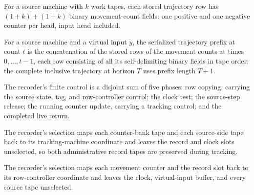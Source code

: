 \begin{definition}
\label{Complexity.clRecFields}
\leanok
{}
For a source machine with $k$ work tapes, each stored trajectory row has $(1+k) + (1+k)$ binary movement-count fields: one positive and one negative counter per head, input head included.
\end{definition}

\begin{definition}
\label{Complexity.clRecords}
\leanok
{}
For a source machine and a virtual input $y$, the serialized trajectory prefix at count $t$ is the concatenation of the stored rows of the movement counts at times $0, \dots, t-1$, each row consisting of all its self-delimiting binary fields in tape order; the complete inclusive trajectory at horizon $T$ uses prefix length $T+1$.
\end{definition}

\begin{definition}
\label{Complexity.clRecState}
\leanok
{}
The recorder's finite control is a disjoint sum of five phases: row copying, carrying the source state, tag, and row-controller control; the clock test; the source-step release; the running counter update, carrying a tracking control; and the completed live return.
\end{definition}

\begin{definition}
\label{Complexity.clRecTrackSelect}
\leanok
{}
The recorder's selection maps each counter-bank tape and each source-side tape back to its tracking-machine coordinate and leaves the record and clock slots unselected, so both administrative record tapes are preserved during tracking.
\end{definition}

\begin{definition}
\label{Complexity.clRecRowSelect}
\leanok
{}
The recorder's selection maps each movement counter and the record slot back to its row-controller coordinate and leaves the clock, virtual-input buffer, and every source tape unselected.
\end{definition}

